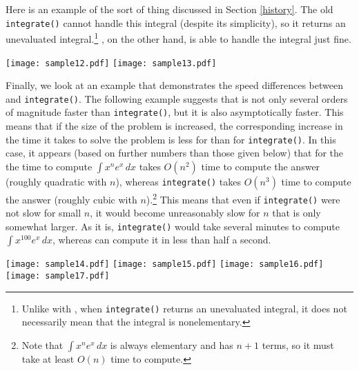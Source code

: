 Here is an example of the sort of thing discussed in Section
\ref{history}.  The old \texttt{integrate()} cannot handle this integral
(despite its simplicity), so it returns an unevaluated
integral.\footnote{Unlike with \rischintegrate{}, when
\texttt{integrate()} returns an unevaluated integral, it does not
necessarily mean that the integral is nonelementary.} 
\rischintegrate{}, on the other hand, is able to handle the integral
just fine.

\begin{flushleft}
\texttt{[image: sample12.pdf]}
\texttt{[image: sample13.pdf]}
\end{flushleft}

Finally, we look at an example that demonstrates the speed differences
between \rischintegrate{} and \texttt{integrate()}.  The following
example suggests that \rischintegrate{} is not only several orders of
magnitude faster than \texttt{integrate()}, but it is also asymptotically
faster.  This means that if the size of the problem is increased, the
corresponding increase in the time it takes to solve the problem is less
for \rischintegrate{} than for \texttt{integrate()}.  In this case, it
appears (based on further numbers than those given below) that for the
the time to compute $\int{x^ne^x\,dx}$ \rischintegrate{} takes $O(n^2)$
time to compute the answer (roughly quadratic with $n$), whereas
\texttt{integrate()} takes $O(n^3)$ time to compute the answer (roughly
cubic with $n$).\footnote{Note that $\int{x^ne^x\,dx}$ is always \gls{elementary} and has $n + 1$ terms, so it must take
at least $O(n)$ time to compute.}  This means that even if
\texttt{integrate()} were not slow for small $n$, it would become
unreasonably slow for $n$ that is only somewhat larger.  As it is,
\texttt{integrate()} would take several minutes to compute
$\int{x^{100}e^x\,dx}$, whereas \rischintegrate{} can compute it in less
than half a second.

\begin{flushleft}
\texttt{[image: sample14.pdf]}
\texttt{[image: sample15.pdf]}
\texttt{[image: sample16.pdf]}
\texttt{[image: sample17.pdf]}
\end{flushleft}
